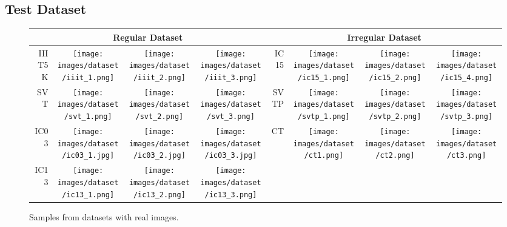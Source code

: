 \documentclass[runningheads]{llncs}
\begin{document}
\subsection{Test Dataset}

\begin{figure}
    \centering
    
\begin{center}
    

\begin{tabular}{| r | c  c  c  |  r | c  c  c |}

\hline
\multicolumn{4}{|c|}{\textbf{Regular Dataset} } & \multicolumn{4}{|c|}{\textbf{Irregular Dataset} } \\
\hline
IIIT5K 
&
\texttt{[image: images/dataset/iiit\_1.png]} & 
\texttt{[image: images/dataset/iiit\_2.png]} &
\texttt{[image: images/dataset/iiit\_3.png]}
&
IC15
&

\texttt{[image: images/dataset/ic15\_1.png]}
&
\texttt{[image: images/dataset/ic15\_2.png]}
&
\texttt{[image: images/dataset/ic15\_4.png]}


\\ 

SVT 
&
\texttt{[image: images/dataset/svt\_1.png]} 
& 
\texttt{[image: images/dataset/svt\_2.png]} 
&
\texttt{[image: images/dataset/svt\_3.png]}

&
SVTP 
&
\texttt{[image: images/dataset/svtp\_1.png]} & 
\texttt{[image: images/dataset/svtp\_2.png]} &
\texttt{[image: images/dataset/svtp\_3.png]}


\\ 


IC03 
&
\texttt{[image: images/dataset/ic03\_1.jpg]} & 
\texttt{[image: images/dataset/ic03\_2.jpg]} &
\texttt{[image: images/dataset/ic03\_3.jpg]}
&
CT 
&
\texttt{[image: images/dataset/ct1.png]} 
& \texttt{[image: images/dataset/ct2.png]} 
&
\texttt{[image: images/dataset/ct3.png]}

\\ 

IC13 
&
\texttt{[image: images/dataset/ic13\_1.png]} & 
\texttt{[image: images/dataset/ic13\_2.png]} &
\texttt{[image: images/dataset/ic13\_3.png]}
& 
{}
& 
{}
&
{}
&
{}
\\ 

\hline

\end{tabular}
\end{center}
    \caption{Samples from datasets with real images.}
    \label{fig:real_dataset}
\end{figure}
\end{document}
